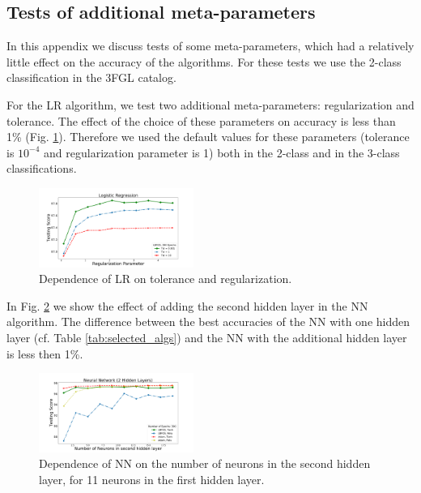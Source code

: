 \documentclass{aa}
\newcommand{\lb}{\label}
\newcommand{\twopicsp}{0.45}
\begin{document}
\begin{appendix}
\section{Tests of additional meta-parameters}
\lb{sec:app}

In this appendix we discuss tests of some meta-parameters, which had a relatively little effect on the 
accuracy of the algorithms. For these tests we use the 2-class classification in the 3FGL catalog.

For the LR algorithm, we test two additional meta-parameters: regularization and tolerance. 
The effect of the choice of these parameters on accuracy is less than 1\% (Fig. \ref{fig:LR_tol_reg}). 
Therefore we used the default values for these parameters (tolerance is $10^{-4}$ and regularization parameter is 1)
both in the 2-class and in the 3-class classifications.

\begin{figure}[h]
\centering
\includegraphics[width=\twopicsp\textwidth]{plots/lr_train_reg.pdf}
\caption{Dependence of LR on tolerance and regularization. 
}
\label{fig:LR_tol_reg}
\end{figure}

In Fig. \ref{fig:nn_nn} we show the effect of adding the second hidden layer in the NN algorithm.
The difference between the best accuracies of the NN with one hidden layer (cf. Table \ref{tab:selected_algs})
and  the NN with the additional hidden layer is less then 1\%.
\begin{figure}[h]
\centering
\includegraphics[width=\twopicsp\textwidth]{plots/nn_2layers_3fgl.pdf}
\caption{Dependence of NN on the number of neurons in the second hidden layer, for 11 neurons in the first hidden layer.
}
\label{fig:nn_nn}
\end{figure}



\end{appendix}
\end{document}
